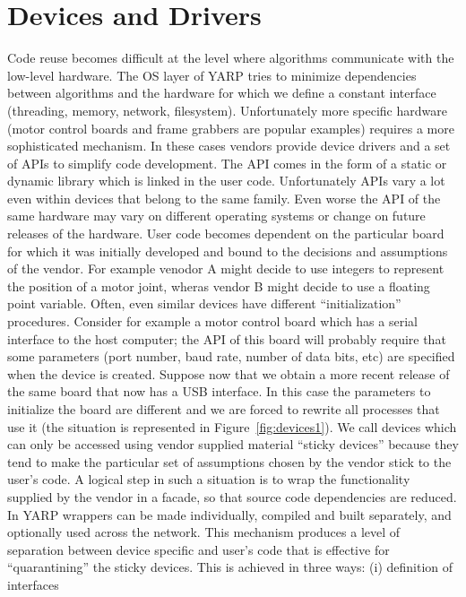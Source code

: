 \section{Devices and Drivers}
Code reuse becomes difficult at the level where algorithms 
communicate with the low-level hardware. The OS layer of YARP tries 
to minimize dependencies between algorithms and the hardware for 
which we define a constant interface (threading, 
memory, network, filesystem). Unfortunately more specific hardware 
(motor control boards and frame grabbers are popular 
examples) requires a more sophisticated mechanism. In these 
cases vendors provide device drivers and a set of APIs to simplify 
code development. The API comes in the form of a static or dynamic 
library which is linked in the user code. Unfortunately
APIs vary a lot even within devices that belong to the same family. 
Even worse the API of the same hardware may vary on different 
operating systems or change on future releases of the hardware. User 
code becomes dependent on the particular board for which it was initially 
developed and bound to the decisions and assumptions of the vendor. For 
example venodor A might decide to use integers to represent the position 
of a motor joint, wheras vendor B might decide to use a floating point
variable. Often, even similar devices have different ``initialization'' 
procedures. Consider for example a motor control board which has a serial
interface to the host computer; the API of this board will probably require 
that some parameters (port number, baud rate, number of data bits, etc) are 
specified when the device is created. Suppose now that we obtain a more 
recent release of the same board that now has a USB interface. In this 
case the parameters to initialize the board are different and we are forced 
to rewrite all processes that use it (the situation is 
represented in Figure~\ref{fig:devices1}). We call devices which 
can only be accessed using vendor supplied material ``sticky devices'' 
because they tend to make the particular set of assumptions chosen by 
the vendor stick to the user's code. A logical step in such a situation 
is to wrap the functionality supplied by the vendor in a facade, so that 
source code dependencies are reduced. In YARP wrappers can be 
made individually, compiled and built separately, and optionally used 
across the network. This mechanism produces a level of separation between 
device specific and user's code that is effective for ``quarantining'' the 
sticky devices. This is achieved in three ways: (i) definition of interfaces 
